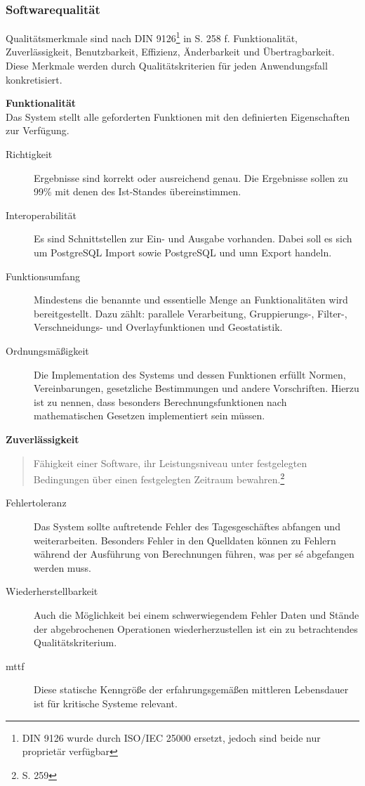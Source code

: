 \subsubsection{Softwarequalität}
\label{softwarequalität}

Qualitätsmerkmale sind nach DIN 9126\footnote{DIN 9126 wurde durch ISO/IEC 25000 ersetzt, jedoch sind beide nur proprietär verfügbar} in \cite{book:lehrbuchsoftware} S. 258 f. Funktionalität, Zuverlässigkeit, Benutzbarkeit, Effizienz, Änderbarkeit und Übertragbarkeit.
Diese Merkmale werden durch Qualitätskriterien für jeden Anwendungsfall konkretisiert.

\textbf{Funktionalität}\\
Das System stellt alle geforderten Funktionen mit den definierten Eigenschaften zur Verfügung.
\begin{description}
\item[Richtigkeit] Ergebnisse sind korrekt oder ausreichend genau. Die Ergebnisse sollen zu 99\% mit denen des Ist-Standes übereinstimmen.
\item[Interoperabilität] Es sind Schnittstellen zur Ein- und Ausgabe vorhanden. Dabei soll es sich um PostgreSQL Import sowie PostgreSQL und \Gls{umn} Export handeln.
\item[Funktionsumfang] Mindestens die benannte und essentielle Menge an Funktionalitäten wird bereitgestellt. Dazu zählt:
parallele Verarbeitung, Gruppierungs-, Filter-, Verschneidungs- und Overlayfunktionen und Geostatistik.
\item[Ordnungsmäßigkeit] Die Implementation des Systems und dessen Funktionen erfüllt Normen, Vereinbarungen, gesetzliche Bestimmungen und andere Vorschriften. Hierzu ist zu nennen, dass besonders Berechnungsfunktionen nach mathematischen Gesetzen implementiert sein müssen.
\end{description}

\textbf{Zuverlässigkeit}\\
\begin{quote}
Fähigkeit einer Software, ihr Leistungsniveau unter festgelegten Bedingungen über einen festgelegten Zeitraum bewahren.\footnote{\cite{book:lehrbuchsoftware} S. 259}
\end{quote}
\begin{description}
\item[Fehlertoleranz] Das System sollte auftretende Fehler des Tagesgeschäftes abfangen und weiterarbeiten. Besonders Fehler in den Quelldaten können zu Fehlern während der Ausführung von Berechnungen führen, was per s\'{e} abgefangen werden muss.
\item[Wiederherstellbarkeit] Auch die Möglichkeit bei einem schwerwiegendem Fehler Daten und Stände der abgebrochenen Operationen wiederherzustellen ist ein zu betrachtendes Qualitätskriterium.
\item[\Gls{mttf}] Diese statische Kenngröße der erfahrungsgemäßen mittleren Lebensdauer ist für kritische Systeme relevant.
\end{description}

